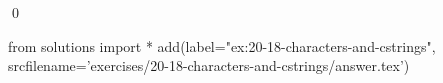
\begin{ex}
  \label{ex:20-18-characters-and-cstrings}
  
  \qed
\end{ex}
\begin{python0}
from solutions import *
add(label="ex:20-18-characters-and-cstrings",
    srcfilename='exercises/20-18-characters-and-cstrings/answer.tex')
\end{python0}
